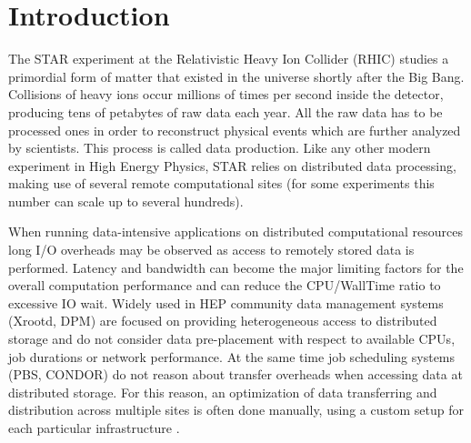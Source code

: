 
\maketitle
\section{Introduction}
\label{intro}
The STAR experiment at the Relativistic Heavy Ion Collider (RHIC) studies a primordial form of matter that existed in the universe shortly after the Big Bang. Collisions of heavy ions occur millions of times per second inside the detector, producing tens of petabytes of raw data each year. All the raw data has to be processed ones in order to reconstruct physical events which are further analyzed by scientists. This process is called data production.
Like any other modern experiment in High Energy Physics, STAR relies on distributed data processing, making use of several remote computational sites (for some experiments this number can scale up to several hundreds).

When running data-intensive applications on distributed computational resources long I/O overheads may be observed as access to remotely stored data is performed. Latency and bandwidth can become the major limiting factors for the overall computation performance and can reduce the CPU/WallTime ratio to excessive IO wait. Widely used in HEP community data management systems (Xrootd, DPM) are focused on providing heterogeneous access to distributed storage and do not consider data pre-placement with respect to available CPUs, job durations or network performance. At the same time job scheduling systems (PBS, CONDOR) do not reason about transfer overheads when accessing data at distributed storage. For this reason, an optimization of data transferring and distribution across multiple sites is often done manually, using a custom setup for each particular infrastructure \cite{Balewski:2012pa}. 


